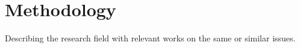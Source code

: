 {\chapter{Methodology}}
\label{sec:related}

Describing the research field with relevant works on the same or similar issues.

